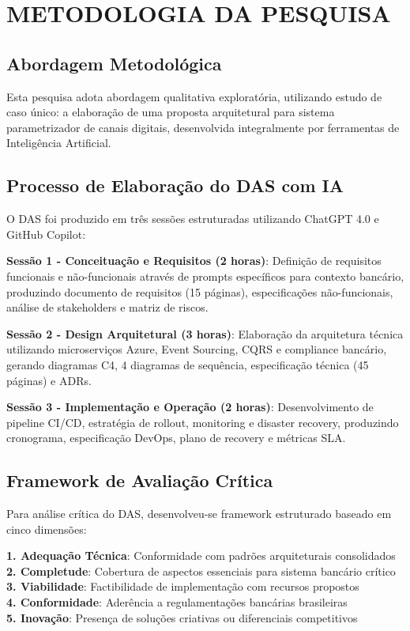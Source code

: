 \chapter{METODOLOGIA DA PESQUISA}

\section{Abordagem Metodológica}

Esta pesquisa adota abordagem qualitativa exploratória, utilizando estudo de caso único: a elaboração de uma proposta arquitetural para sistema parametrizador de canais digitais, desenvolvida integralmente por ferramentas de Inteligência Artificial.

\section{Processo de Elaboração do DAS com IA}

O DAS foi produzido em três sessões estruturadas utilizando ChatGPT 4.0 e GitHub Copilot:

\textbf{Sessão 1 - Conceituação e Requisitos (2 horas)}: Definição de requisitos funcionais e não-funcionais através de prompts específicos para contexto bancário, produzindo documento de requisitos (15 páginas), especificações não-funcionais, análise de stakeholders e matriz de riscos.

\textbf{Sessão 2 - Design Arquitetural (3 horas)}: Elaboração da arquitetura técnica utilizando microserviços Azure, Event Sourcing, CQRS e compliance bancário, gerando diagramas C4, 4 diagramas de sequência, especificação técnica (45 páginas) e ADRs.

\textbf{Sessão 3 - Implementação e Operação (2 horas)}: Desenvolvimento de pipeline CI/CD, estratégia de rollout, monitoring e disaster recovery, produzindo cronograma, especificação DevOps, plano de recovery e métricas SLA.

\section{Framework de Avaliação Crítica}

Para análise crítica do DAS, desenvolveu-se framework estruturado baseado em cinco dimensões:

\textbf{1. Adequação Técnica}: Conformidade com padrões arquiteturais consolidados \\
\textbf{2. Completude}: Cobertura de aspectos essenciais para sistema bancário crítico \\
\textbf{3. Viabilidade}: Factibilidade de implementação com recursos propostos \\
\textbf{4. Conformidade}: Aderência a regulamentações bancárias brasileiras \\
\textbf{5. Inovação}: Presença de soluções criativas ou diferenciais competitivos

